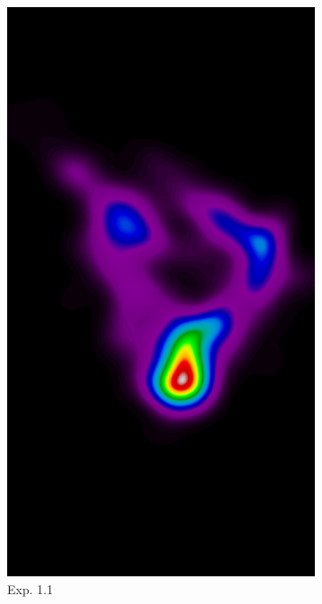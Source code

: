 \documentclass{beamer}
\begin{document}
\begin{frame}
\begin{figure}
\begin{subfigure}{0.134\textwidth}
		            \includegraphics[width=\textwidth]{plots/examples/example5_probs_1_1.png}
	            \caption*{\footnotesize Exp. 1.1}
            \end{subfigure}
            \begin{subfigure}{0.134\textwidth}
	            \centering

\end{subfigure}
\end{figure}
\end{frame}
\end{document}
